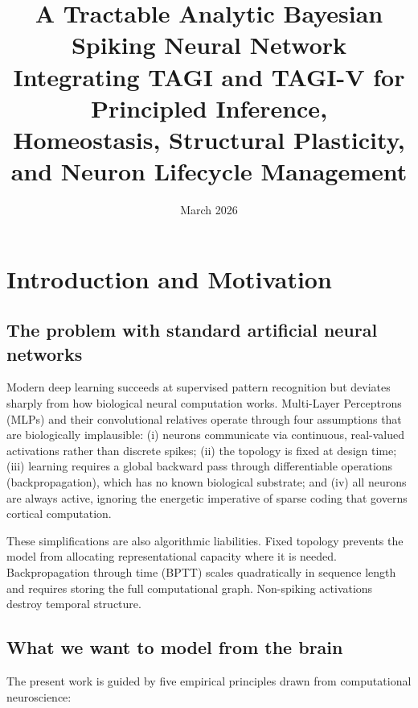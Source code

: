 \documentclass[12pt, a4paper]{article}
\title{
    \Large\textbf{A Tractable Analytic Bayesian Spiking Neural Network}\\[0.4em]
    \large Integrating TAGI and TAGI-V for Principled Inference,\\
    Homeostasis, Structural Plasticity, and Neuron Lifecycle Management
}
\author{}
\date{March 2026}
\begin{document}
\maketitle
\tableofcontents
\newpage

\section{Introduction and Motivation}
\label{sec:intro}

\subsection{The problem with standard artificial neural networks}

Modern deep learning succeeds at supervised pattern recognition but deviates sharply from
how biological neural computation works. Multi-Layer Perceptrons (MLPs) and their
convolutional relatives operate through four assumptions that are biologically implausible:
(i) neurons communicate via continuous, real-valued activations rather than discrete
spikes; (ii) the topology is fixed at design time; (iii) learning requires a global
backward pass through differentiable operations (backpropagation), which has no known
biological substrate; and (iv) all neurons are always active, ignoring the energetic
imperative of sparse coding that governs cortical computation.

These simplifications are also algorithmic liabilities. Fixed topology prevents the model
from allocating representational capacity where it is needed. Backpropagation through
time (BPTT) scales quadratically in sequence length and requires storing the full
computational graph. Non-spiking activations destroy temporal structure.

\subsection{What we want to model from the brain}

The present work is guided by five empirical principles drawn from computational
neuroscience:
\end{document}
